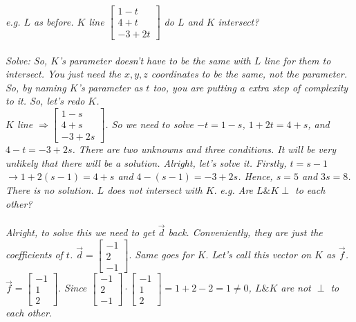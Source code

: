\documentclass[addpoints]{exam}
\begin{document}
\textit{
e.g. $L$ as before. $K$ line $\begin{bmatrix}
    1-t\\4+t\\-3+2t
\end{bmatrix}$ do $L$ and $K$ intersect?\\\\
Solve: So, $K$'s parameter doesn't have to be the same with $L$ line for them to intersect. You just need the $x,y,z$ coordinates to be the same, not the parameter. So, by naming $K$'s parameter as $t$ too, you are putting a extra step of complexity to it. So, let's redo $K$.\\
$K$ line $\Rightarrow \begin{bmatrix}
    1-s\\4+s\\-3+2s
\end{bmatrix}$. So we need to solve $-t=1-s$, $1+2t=4+s$, and $4-t=-3+2s$. There are two unknowns and three conditions. It will be very unlikely that there will be a solution. Alright, let's solve it. Firstly, $t=s-1$ $\rightarrow 1+2(s-1)=4+s$ and $4-(s-1)=-3+2s$. Hence, $s=5$ and $3s=8$. There is no solution. $L$ does not intersect with $K.$
}
\textit{
e.g. Are $L\&K\perp$ to each other?\\\\
Alright, to solve this we need to get $\vec{d}$ back. Conveniently, they are just the coefficients of $t$. $\vec{d}=\begin{bmatrix}
    -1\\2\\-1
\end{bmatrix}.$ Same goes for $K.$ Let's call this vector on $K$ as $\vec{f}$. $\vec{f}=\begin{bmatrix}
    -1\\1\\2
\end{bmatrix}.$ Since $\begin{bmatrix}
    -1\\2\\-1
\end{bmatrix}\cdot\begin{bmatrix}
    -1\\1\\2
\end{bmatrix}=1+2-2=1\neq0$, $L\&K$ are not $\perp$ to each other.
}\pagebreak\\
\end{document}
